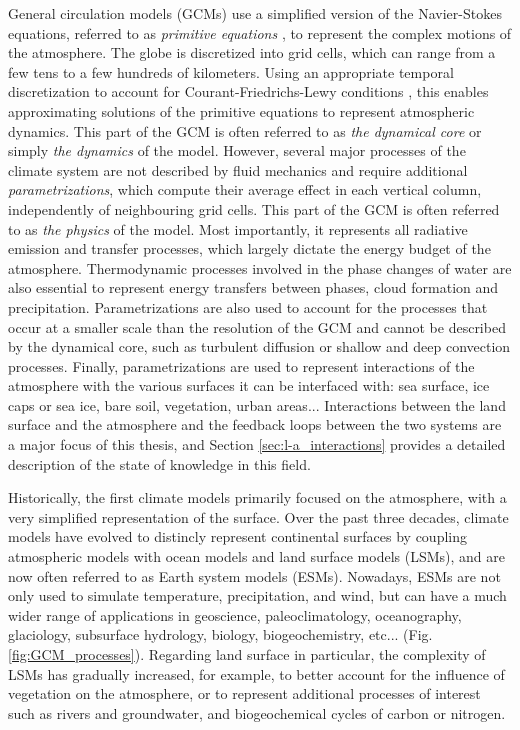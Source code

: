 General circulation models (GCMs) use a simplified version of the Navier-Stokes equations, referred to as \textit{primitive equations} \citep{bjerknes1910}, to represent the complex motions of the atmosphere. 
The globe is discretized into grid cells, which can range from a few tens to a few hundreds of kilometers. Using an appropriate temporal discretization to account for Courant-Friedrichs-Lewy conditions \citep{courant_partial_1967}, this enables approximating solutions of the primitive equations to represent atmospheric dynamics. This part of the GCM is often referred to as \textit{the dynamical core} or simply \textit{the dynamics} of the model. 
However, several major processes of the climate system are not described by fluid mechanics and require additional \textit{parametrizations}, which compute their average effect in each vertical column, independently of neighbouring grid cells. 
This part of the GCM is often referred to as \textit{the physics} of the model.
Most importantly, it represents all radiative emission and transfer processes, which largely dictate the energy budget of the atmosphere.
Thermodynamic processes involved in the phase changes of water are also essential to represent energy transfers between phases, cloud formation and precipitation. Parametrizations are also used to account for the processes that occur at a smaller scale than the resolution of the GCM and cannot be described by the dynamical core, such as turbulent diffusion or shallow and deep convection processes. Finally, parametrizations are used to represent interactions of the atmosphere with the various surfaces it can be interfaced with: sea surface, ice caps or sea ice, bare soil, vegetation, urban areas... 
Interactions between the land surface and the atmosphere and the feedback loops between the two systems are a major focus of this thesis, and Section \ref{sec:l-a_interactions} provides a detailed description of the state of knowledge in this field. 

Historically, the first climate models primarily focused on the atmosphere, with
a very simplified representation of the surface. Over the past three decades, climate models have evolved to distincly represent continental surfaces by coupling atmospheric models with ocean models and land surface models (LSMs), and are now often referred to as Earth system models (ESMs). Nowadays, ESMs are not only used to simulate temperature, precipitation, and wind, but can have a much wider range of applications in geoscience, paleoclimatology, oceanography, glaciology, subsurface hydrology, biology, biogeochemistry, etc... (Fig. \ref{fig:GCM_processes}).
Regarding land surface in particular, the complexity of LSMs has gradually increased, for example, to better account for the influence of vegetation on the atmosphere, or to represent additional processes of interest such as rivers and groundwater, and biogeochemical cycles of carbon or nitrogen. 

